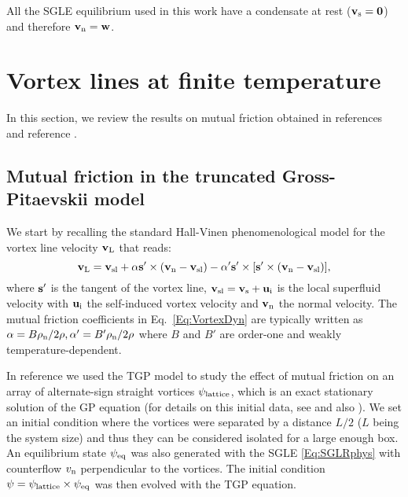 \documentclass[sn-mathphys]{sn-jnl}%
\begin{document}
All the SGLE equilibrium used in this work have a condensate at rest (${\bf v_{\rm s}=0}$) and therefore ${\bf v_{\rm n}}={\bf w}$.

\section{Vortex lines at finite temperature}\label{sec:mutual}
In this section, we review the results on mutual friction obtained in references \cite{Krstulovic11} and reference \cite{Krstulovic11b}.

\subsection{Mutual friction in the truncated Gross-Pitaevskii model} \label{sec:lines}

We start by recalling the standard Hall-Vinen phenomenological model for the vortex line velocity ${\bf v}_{\rm L}$ \cite{Donnelly,HallVinen1_1956,HallVinen2_1956} that reads:
\begin{equation} 
{\bf v}_{\rm L}={\bf v}_{\rm sl}+\alpha {\bf s'}\times({\bf v}_{\rm n}-{\bf v}_{\rm sl})-\alpha'{\bf s'}\times[{\bf s}'\times({\bf v}_{\rm n}-{\bf v}_{\rm sl})],\label{Eq:VortexDyn}
\end{equation}
where ${\bf s}'$ is the tangent of the vortex line, ${\bf v}_{\rm sl}={\bf v}_{\rm s}+{\bf u}_{\rm i}$ is the local superfluid velocity with  ${\bf u}_{\rm i}$  the self-induced vortex velocity and ${\bf v_{\rm n}}$ the normal velocity. The mutual friction coefficients in Eq.~\eqref{Eq:VortexDyn} are typically written as $\alpha=B\rho_{\rm n}/2\rho, \alpha'=B'\rho_{\rm n}/2\rho$ where $B$ and $B'$ are order-one and weakly temperature-dependent. 

In reference \cite{Krstulovic11b} we used the TGP model to study the effect of mutual friction on an array of alternate-sign straight vortices $\psi_{\rm lattice}$, which is an exact stationary solution of the GP equation (for details on this initial data, see \cite{Krstulovic11} and also \cite{Nore94}). We set an initial condition where the vortices were separated by a distance $L/2$ ($L$ being the system size) and thus they can be considered isolated for a large enough box. An equilibrium state $\psi_{\rm eq}$ was also generated with the SGLE \eqref{Eq:SGLRphys} with counterflow $v_{\rm n}$ perpendicular to the vortices. The initial condition $\psi=\psi_{\rm lattice}\times\psi_{\rm eq}$ was then evolved with the TGP equation.
\end{document}
